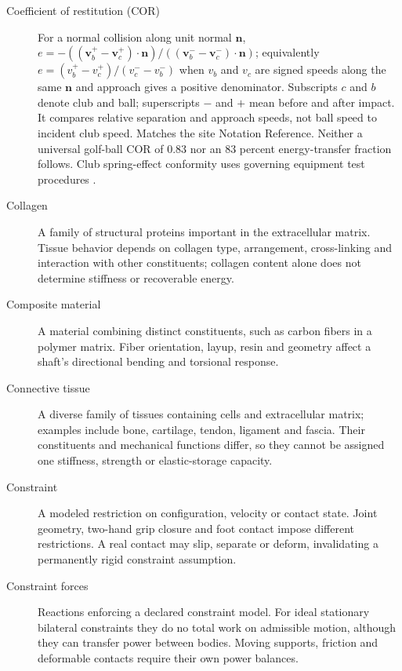 \begin{description}
\item[Coefficient of restitution (COR)] For a normal collision along unit normal $\mathbf{n}$, $e=-((\mathbf{v}_b^+-\mathbf{v}_c^+)\cdot\mathbf{n})/((\mathbf{v}_b^--\mathbf{v}_c^-)\cdot\mathbf{n})$; equivalently $e=(v_b^+-v_c^+)/(v_c^--v_b^-)$ when $v_b$ and $v_c$ are signed speeds along the same $\mathbf{n}$ and approach gives a positive denominator. Subscripts $c$ and $b$ denote club and ball; superscripts $-$ and $+$ mean before and after impact. It compares relative separation and approach speeds, not ball speed to incident club speed. Matches the site Notation Reference. Neither a universal golf-ball COR of 0.83 nor an 83 percent energy-transfer fraction follows. Club spring-effect conformity uses governing equipment test procedures \citep{glossaryUSGAEquipment}.

\item[Collagen] A family of structural proteins important in the extracellular matrix. Tissue behavior depends on collagen type, arrangement, cross-linking and interaction with other constituents; collagen content alone does not determine stiffness or recoverable energy.

\item[Composite material] A material combining distinct constituents, such as carbon fibers in a polymer matrix. Fiber orientation, layup, resin and geometry affect a shaft's directional bending and torsional response.

\item[Connective tissue] A diverse family of tissues containing cells and extracellular matrix; examples include bone, cartilage, tendon, ligament and fascia. Their constituents and mechanical functions differ, so they cannot be assigned one stiffness, strength or elastic-storage capacity.

\item[Constraint] A modeled restriction on configuration, velocity or contact state. Joint geometry, two-hand grip closure and foot contact impose different restrictions. A real contact may slip, separate or deform, invalidating a permanently rigid constraint assumption.

\item[Constraint forces] Reactions enforcing a declared constraint model. For ideal stationary bilateral constraints they do no total work on admissible motion, although they can transfer power between bodies. Moving supports, friction and deformable contacts require their own power balances.


\end{description}

